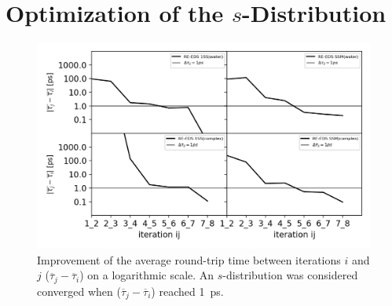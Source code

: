 \section{Optimization of the $s$-Distribution}
\begin{figure}[h]
\centering
\includegraphics[width=\linewidth]{fig/results/ringOpening/paramOptimization/s_optimization_efficiency_RingOpening_log_scale.png}
\caption{Improvement of the average round-trip time between iterations $i$ and $j$ ($\overline{\tau}_j - \overline{\tau}_i$) on a logarithmic scale. An $s$-distribution was considered converged when ($\overline{\tau}_j - \overline{\tau}_i$) reached 1~ps.}
\label{SIfig:CHK1_RingOpening_soptimization_efficiency}
\end{figure}


\newpage

